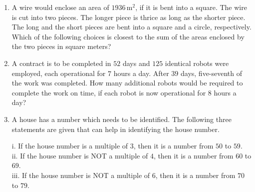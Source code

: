 \documentclass[journal,12pt,onecolumn]{IEEEtran}
\theoremstyle{remark}
\begin{document}
\begin{enumerate}[start=7]
    \item A wire would enclose an area of $1936 \, \text{m}^2$, if it is bent into a square. The wire is cut into two pieces. The longer piece is thrice as long as the shorter piece. The long and the short pieces are bent into a square and a circle, respectively. Which of the following choices is closest to the sum of the areas enclosed by the two pieces in square meters? \nolinebreak
    
    \hfill\mbox{}
    \begin{enumerate}
    \end{enumerate}
\newpage
    \item A contract is to be completed in $52$ days and $125$ identical robots were employed, each operational for $7$ hours a day. After $39$ days, five-seventh of the work was completed. How many additional robots would be required to complete the work on time, if each robot is now operational for $8$ hours a day? \nolinebreak
    
    \hfill\mbox{}
    \begin{enumerate}
    \end{enumerate}

    \item A house has a number which needs to be identified. The following three statements are given that can help in identifying the house number. \nolinebreak
    
    \hfill\mbox{}

    i. If the house number is a multiple of $3$, then it is a number from $50$ to $59$. \\
    ii. If the house number is NOT a multiple of $4$, then it is a number from $60$ to $69$. \\
    iii. If the house number is NOT a multiple of $6$, then it is a number from $70$ to $79$.


\end{enumerate}
\end{document}
